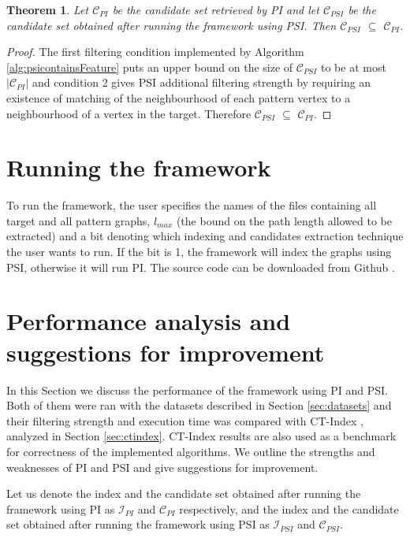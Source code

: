 \documentclass{l4proj}
\newtheorem{theorem}{Theorem}[section]
\newcommand{\fancyI}{\mathcal{I}}
\newcommand{\fancyC}{\mathcal{C}}
\begin{document}
\begin{theorem}
\label{psiisbettertheorem}
Let $\fancyC_{PI}$ be the candidate set retrieved by PI and let $\fancyC_{PSI}$ be the candidate set obtained after running the framework using PSI. Then $\fancyC_{PSI}$ $\subseteq$ $\fancyC_{PI}$.
\end{theorem}

\begin{proof}
The first filtering condition implemented by Algorithm \ref{alg:psicontainsFeature} puts an upper bound on the size of $\fancyC_{PSI}$ to be at most $|\fancyC_{PI}|$ and condition 2 gives PSI additional filtering strength by requiring an existence of matching of the neighbourhood of each pattern vertex to a neighbourhood of a vertex in the target. Therefore $\fancyC_{PSI}$ $\subseteq$ $\fancyC_{PI}$. 
\end{proof}

\section{Running the framework}
To run the framework, the user specifies the names of the files containing all target and all pattern graphs, $l_{max}$ (the bound on the path length allowed to be extracted) and a bit denoting which indexing and candidates extraction technique the user wants to run. If the bit is 1, the framework will index the graphs using PSI, otherwise it will run PI. The source code can be downloaded from Github \cite{framework-github}.

\section{Performance analysis and suggestions for improvement}
\label{sec:performance}
In this Section we discuss the performance of the framework using PI and PSI. Both of them were ran with the datasets described in Section \ref{sec:datasets} and their filtering strength and execution time was compared with CT-Index \cite{ctindex}, analyzed in Section \ref{sec:ctindex}. CT-Index results are also used as a benchmark for correctness of the implemented algorithms. We outline the strengths and weaknesses of PI and PSI and give suggestions for improvement.

Let us denote the index and the candidate set obtained after running the framework using PI as $\fancyI_{PI}$ and $\fancyC_{PI}$ respectively, and the index and the candidate set obtained after running the framework using PSI as $\fancyI_{PSI}$ and $\fancyC_{PSI}$. 
\end{document}
